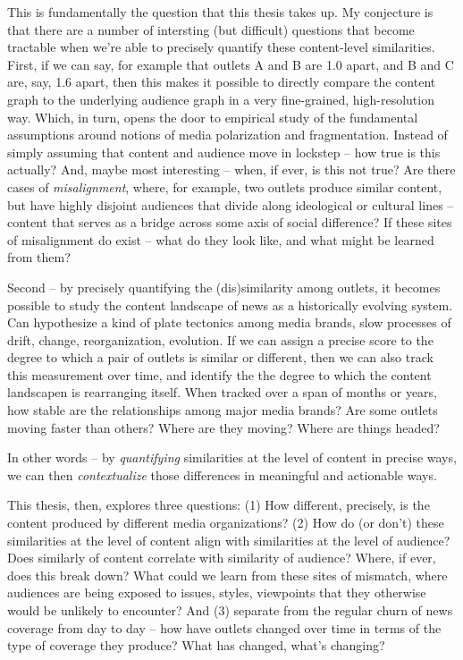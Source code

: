 \documentclass{scrartcl}
\begin{document}
This is fundamentally the question that this thesis takes up. My conjecture is that there are a number of intersting (but difficult) questions that become tractable when we're able to precisely quantify these content-level similarities. First, if we can say, for example that outlets A and B are 1.0 apart, and B and C are, say, 1.6 apart, then this makes it possible to directly compare the content graph to the underlying audience graph in a very fine-grained, high-resolution way. Which, in turn, opens the door to empirical study of the fundamental assumptions around notions of media polarization and fragmentation. Instead of simply assuming that content and audience move in lockstep -- how true is this actually? And, maybe most interesting -- when, if ever, is this not true? Are there cases of \textit{misalignment}, where, for example, two outlets produce similar content, but have highly disjoint audiences that divide along ideological or cultural lines -- content that serves as a bridge across some axis of social difference? If these sites of  misalignment do exist -- what do they look like, and what might be learned from them?

Second -- by precisely quantifying the (dis)similarity among outlets, it becomes possible to study the content landscape of news as a historically evolving system. Can hypothesize a kind of plate tectonics among media brands, slow processes of drift, change, reorganization, evolution. If we can assign a precise score to the degree to which a pair of outlets is similar or different, then we can also track this measurement over time, and identify the the degree to which the content landscapen is rearranging itself. When tracked over a span of months or years, how stable are the relationships among major media brands? Are some outlets moving faster than others? Where are they moving? Where are things headed?

In other words -- by \textit{quantifying} similarities at the level of content in precise ways, we can then \textit{contextualize} those differences in meaningful and actionable ways.

This thesis, then, explores three questions: (1) How different, precisely, is the content produced by different media organizations? (2) How do (or don't) these similarities at the level of content align with similarities at the level of audience? Does similarly of content correlate with similarity of audience? Where, if ever, does this break down? What could we learn from these sites of mismatch, where audiences are being exposed to issues, styles, viewpoints that they otherwise would be unlikely to encounter? And (3) separate from the regular churn of news coverage from day to day -- how have outlets changed over time in terms of the type of coverage they produce? What has changed, what's changing?
\end{document}
